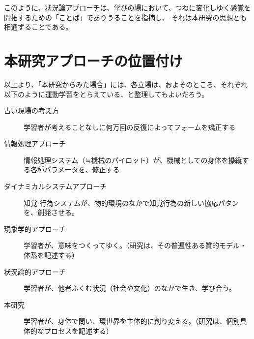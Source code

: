このように、状況論アプローチは、学びの場において、つねに変化しゆく感覚を開拓するための「ことば」でありうることを指摘し、
それは本研究の思想とも相通ずることである。
\section{本研究アプローチの位置付け}
以上より、「本研究からみた場合」には、各立場は、およそのところ、それぞれ以下のように運動学習をとらえている、と整理してもよいだろう。
\begin{description}
  \item [古い現場の考え方]学習者が考えることなしに何万回の反復によってフォームを矯正する
  \item [情報処理アプローチ]情報処理システム（≒機械のパイロット）が、機械としての身体を操縦する各種パラメータを、修正する
  \item [ダイナミカルシステムアプローチ]知覚-行為システムが、物的環境のなかで知覚行為の新しい協応パタンを、創発させる。
  \item [現象学的アプローチ]学習者が、意味をつくってゆく。（研究は、その普遍性ある質的モデル・体系を記述する）
  \item [状況論的アプローチ]学習者が、他者ふくむ状況（社会や文化）のなかで生き、学び合う。
  \item [本研究]学習者が、身体で問い、環世界を主体的に創り変える。（研究は、個別具体的なプロセスを記述する）
\end{description}


